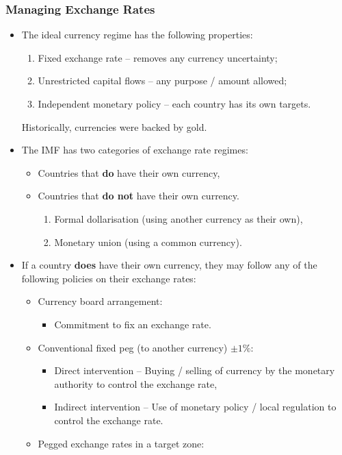 \documentclass[../notes_compiled.tex]{subfiles}
\begin{document}
\subsubsection{Managing Exchange Rates}
\begin{itemize}
\item The ideal currency regime has the following properties:
\begin{enumerate}
\item Fixed exchange rate -- removes any currency uncertainty;
\item Unrestricted capital flows -- any purpose / amount allowed;
\item Independent monetary policy -- each country has its own targets.
\end{enumerate}
Historically, currencies were backed by gold.
\item The IMF has two categories of exchange rate regimes:
\begin{itemize}
\item Countries that \textbf{do} have their own currency,
\item Countries that \textbf{do not} have their own currency.
\begin{enumerate}
\item Formal dollarisation (using another currency as their own),
\item Monetary union (using a common currency).
\end{enumerate}
\end{itemize}
\item If a country \textbf{does} have their own currency, they may follow any of the following policies on their exchange rates:
\begin{itemize}
\item Currency board arrangement:
\begin{itemize}
\item Commitment to fix an exchange rate.
\end{itemize}
\item Conventional fixed peg (to another currency) $\pm1\%$:
\begin{itemize}
\item Direct intervention -- Buying / selling of currency by the monetary authority to control the exchange rate,
\item Indirect intervention -- Use of monetary policy / local regulation to control the exchange rate.
\end{itemize}
\item Pegged exchange rates in a target zone:

\end{itemize}
\end{itemize}
\end{document}
